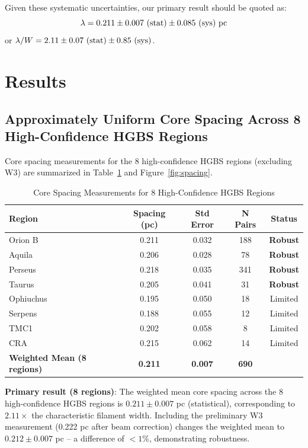 \documentclass[11pt,a4paper]{article}
\begin{document}
Given these systematic uncertainties, our primary result should be quoted as:
\begin{equation}
\lambda = 0.211 \pm 0.007~({\rm stat}) \pm 0.085~({\rm sys})~{\rm pc}
\end{equation}
or $\lambda/W = 2.11 \pm 0.07~({\rm stat}) \pm 0.85~({\rm sys})$.

\section{Results}
\label{sec:results}

\subsection{Approximately Uniform Core Spacing Across 8 High-Confidence HGBS Regions}

Core spacing measurements for the 8 high-confidence HGBS regions (excluding W3) are summarized in Table~\ref{tab:all_regions} and Figure~\ref{fig:spacing}.

\begin{table}[H]
\centering
\caption{Core Spacing Measurements for 8 High-Confidence HGBS Regions}
\label{tab:all_regions}
\begin{tabular}{lcccc}
\toprule
Region & Spacing (pc) & Std Error & N Pairs & Status \\
\midrule
Orion B  & 0.211 & 0.032 & 188 & \textbf{Robust} \\
Aquila   & 0.206 & 0.028 & 78  & \textbf{Robust} \\
Perseus  & 0.218 & 0.035 & 341 & \textbf{Robust} \\
Taurus   & 0.205 & 0.041 & 31  & \textbf{Robust} \\
\midrule
Ophiuchus& 0.195 & 0.050 & 18  & Limited \\
Serpens  & 0.188 & 0.055 & 12  & Limited \\
TMC1     & 0.202 & 0.058 & 8   & Limited \\
CRA      & 0.215 & 0.062 & 14  & Limited \\
\midrule
\textbf{Weighted Mean (8 regions)} & \textbf{0.211} & \textbf{0.007} & \textbf{690} & \\
\bottomrule
\end{tabular}
\end{table}

\noindent\textbf{Primary result (8 regions)}: The weighted mean core spacing across the 8 high-confidence HGBS regions is $0.211 \pm 0.007$ pc (statistical), corresponding to $2.11\times$ the characteristic filament width. Including the preliminary W3 measurement (0.222 pc after beam correction) changes the weighted mean to $0.212 \pm 0.007$ pc -- a difference of $<1$\%, demonstrating robustness.
\end{document}
